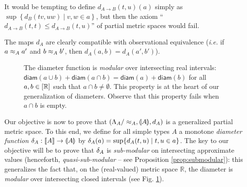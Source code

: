 It would be tempting to define $d_{A \to B}(t,u)(a)$ simply as $\sup \left\{ d_B(tv, uw) \mid v,w \in a \right\}$, but then the axiom ``$d_{A \to B}(t,t) \leq d_{A \to B}(t,u)$'' of partial metric spaces would fail.

The maps $d_{A}$ are clearly compatible with observational equivalence (\textit{i.e.} if $a \approx_A a'$ and $b \approx_A b'$, then $d_A(a,b) = d_A(a',b')$). 


\begin{figure}
\caption{\small The diameter function is \emph{modular} over intersecting real intervals: 
$\mathsf{diam}(a\cup  b)+\mathsf{diam}(a\cap b)=\mathsf{diam}(a)+\mathsf{diam}(b)$ for all $a,b\in [\mathbb{R}]$ such that $a\cap b\neq \emptyset$.
This property is at the heart of our generalization of diameters. Observe that this property fails when $a\cap b$ is empty.}
\label{fig:modular}
\end{figure}


Our objective is now to prove that $\left(\Lambda_A/\approx_A, \llparenthesis A \rrparenthesis, d_A\right)$ is a generalized partial metric space.
To this end, we define for all simple types $A$ a monotone \emph{diameter function} $\delta_A : \llbracket A \rrbracket \to \llparenthesis A \rrparenthesis$ by $\delta_A(a) = \sup \{ d_A(t,u) \mid t,u \in a \}$. The key to our objective will be to prove that $\delta_{A}$ is \emph{sub-modular} on intersecting approximate values (henceforth, \emph{quasi-sub-modular} -- see Proposition \ref{prop:submodular}): this generalizes the fact that, on the (real-valued) metric space $\mathbb{R}$, the diameter is \emph{modular} over intersecting closed intervals (see Fig. \ref{fig:modular}).
 
